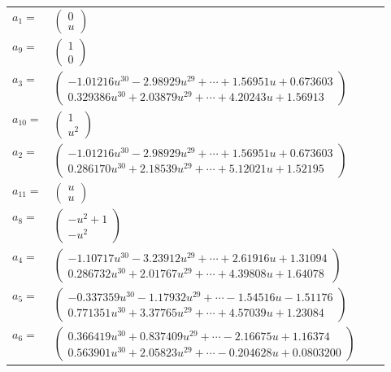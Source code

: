 \documentclass[1p]{elsarticle_modified}
\theoremstyle{definition}
\begin{document}
\begin{tabular}{m{7pt} m{180pt} m{7pt} m{180pt} }
\flushright $a_{1}=$&$\begin{pmatrix}0\\u\end{pmatrix}$ \\
\flushright $a_{9}=$&$\begin{pmatrix}1\\0\end{pmatrix}$ \\
\flushright $a_{3}=$&$\begin{pmatrix}-1.01216 u^{30}-2.98929 u^{29}+\cdots+1.56951 u+0.673603\\0.329386 u^{30}+2.03879 u^{29}+\cdots+4.20243 u+1.56913\end{pmatrix}$ \\
\flushright $a_{10}=$&$\begin{pmatrix}1\\u^2\end{pmatrix}$ \\
\flushright $a_{2}=$&$\begin{pmatrix}-1.01216 u^{30}-2.98929 u^{29}+\cdots+1.56951 u+0.673603\\0.286170 u^{30}+2.18539 u^{29}+\cdots+5.12021 u+1.52195\end{pmatrix}$ \\
\flushright $a_{11}=$&$\begin{pmatrix}u\\u\end{pmatrix}$ \\
\flushright $a_{8}=$&$\begin{pmatrix}- u^2+1\\- u^2\end{pmatrix}$ \\
\flushright $a_{4}=$&$\begin{pmatrix}-1.10717 u^{30}-3.23912 u^{29}+\cdots+2.61916 u+1.31094\\0.286732 u^{30}+2.01767 u^{29}+\cdots+4.39808 u+1.64078\end{pmatrix}$ \\
\flushright $a_{5}=$&$\begin{pmatrix}-0.337359 u^{30}-1.17932 u^{29}+\cdots-1.54516 u-1.51176\\0.771351 u^{30}+3.37765 u^{29}+\cdots+4.57039 u+1.23084\end{pmatrix}$ \\
\flushright $a_{6}=$&$\begin{pmatrix}0.366419 u^{30}+0.837409 u^{29}+\cdots-2.16675 u+1.16374\\0.563901 u^{30}+2.05823 u^{29}+\cdots-0.204628 u+0.0803200\end{pmatrix}$ \\

\end{tabular}
\end{document}

